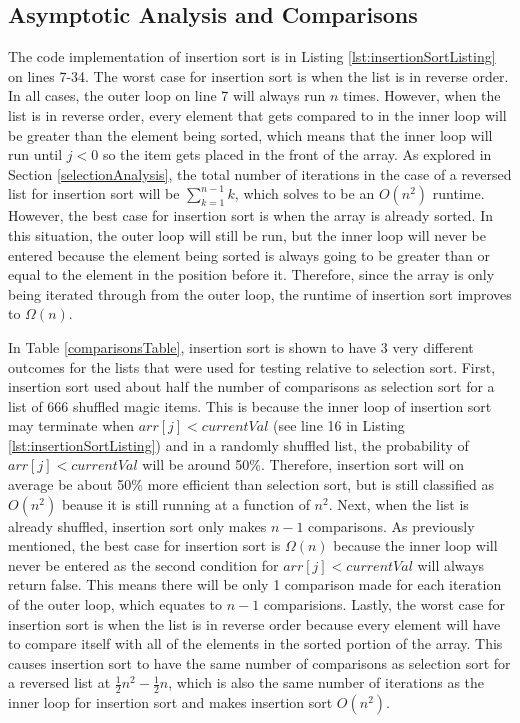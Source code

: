 \documentclass[letterpaper, 10pt,DIV=13]{scrartcl}
\numberwithin{equation}{section} %
\numberwithin{figure}{section} %
\numberwithin{table}{section} %
\begin{document}
\subsection{Asymptotic Analysis and Comparisons}\label{insertionAnalysis}
The code implementation of insertion sort is in Listing \ref{lst:insertionSortListing} on lines 7-34. The worst case for insertion sort is when the list is in reverse order. In all cases, the outer loop on line 7 will always run $n$ times. However, when the list is in reverse order, every element that gets compared to in the inner loop will be greater than the element being sorted, which means that the inner loop will run until $j < 0$ so the item gets placed in the front of the array. As explored in Section \ref{selectionAnalysis}, the total number of iterations in the case of a reversed list for insertion sort will be $\sum_{k = 1} ^{n - 1} k$, which solves to be an $O(n^2)$ runtime. However, the best case for insertion sort is when the array is already sorted. In this situation, the outer loop will still be run, but the inner loop will never be entered because the element being sorted is always going to be greater than or equal to the element in the position before it. Therefore, since the array is only being iterated through from the outer loop, the runtime of insertion sort improves to $\Omega(n)$.

In Table \ref{comparisonsTable}, insertion sort is shown to have 3 very different outcomes for the lists that were used for testing relative to selection sort. First, insertion sort used about half the number of comparisons as selection sort for a list of 666 shuffled magic items. This is because the inner loop of insertion sort may terminate when $arr[j] < currentVal$ (see line 16 in Listing \ref{lst:insertionSortListing}) and in a randomly shuffled list, the probability of $arr[j] < currentVal$ will be around 50\%. Therefore, insertion sort will on average be about 50\% more efficient than selection sort, but is still classified as $O(n^2)$ beause it is still running at a function of $n^2$. Next, when the list is already shuffled, insertion sort only makes $n-1$ comparisons. As previously mentioned, the best case for insertion sort is $\Omega(n)$ because the inner loop will never be entered as the second condition for $arr[j] < currentVal$ will always return false. This means there will be only 1 comparison made for each iteration of the outer loop, which equates to $n - 1$ comparisions. Lastly, the worst case for insertion sort is when the list is in reverse order because every element will have to compare itself with all of the elements in the sorted portion of the array. This causes insertion sort to have the same number of comparisons as selection sort for a reversed list at $\frac{1}{2}n^2 - \frac{1}{2}n$, which is also the same number of iterations as the inner loop for insertion sort and makes insertion sort $O(n^2)$.
\end{document}
